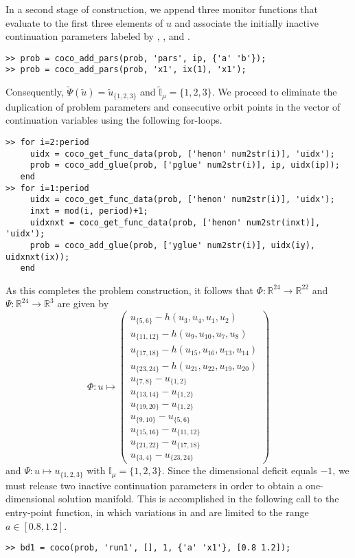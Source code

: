 In a second stage of construction, we append three monitor functions that evaluate to the first three elements of $u$ and associate the initially inactive continuation parameters labeled by , , and .
\begin{lstlisting}[language=coco-highlight]
>> prob = coco_add_pars(prob, 'pars', ip, {'a' 'b'});
>> prob = coco_add_pars(prob, 'x1', ix(1), 'x1');
\end{lstlisting}
Consequently, $\tilde{\Psi}(\tilde{u})=\tilde{u}_{\{1,2,3\}}$ and $\tilde{\mathbb{I}}_\mu=\{1,2,3\}$. We proceed to eliminate the duplication of problem parameters and consecutive orbit points in the vector of continuation variables using the following for-loops.
\begin{lstlisting}[language=coco-highlight]
>> for i=2:period
     uidx = coco_get_func_data(prob, ['henon' num2str(i)], 'uidx');
     prob = coco_add_glue(prob, ['pglue' num2str(i)], ip, uidx(ip));
   end
>> for i=1:period
     uidx = coco_get_func_data(prob, ['henon' num2str(i)], 'uidx');
     inxt = mod(i, period)+1;
     uidxnxt = coco_get_func_data(prob, ['henon' num2str(inxt)], 'uidx');
     prob = coco_add_glue(prob, ['yglue' num2str(i)], uidx(iy), uidxnxt(ix));
   end
\end{lstlisting}
As this completes the problem construction, it follows that $\Phi:\mathbb{R}^{24}\rightarrow\mathbb{R}^{22}$ and $\Psi:\mathbb{R}^{24}\rightarrow\mathbb{R}^3$ are given by
\begin{equation}
\Phi:u\mapsto\left(\begin{array}{c}u_{\{5,6\}}-h(u_3,u_4,u_1,u_2)\\u_{\{11,12\}}-h(u_9,u_{10},u_7,u_8)\\u_{\{17,18\}}-h(u_{15},u_{16},u_{13},u_{14})\\u_{\{23,24\}}-h(u_{21},u_{22},u_{19},u_{20})\\u_{\{7,8\}}-u_{\{1,2\}}\\u_{\{13,14\}}-u_{\{1,2\}}\\u_{\{19,20\}}-u_{\{1,2\}}\\u_{\{9,10\}}-u_{\{5,6\}}\\u_{\{15,16\}}-u_{\{11,12\}}\\u_{\{21,22\}}-u_{\{17,18\}}\\u_{\{3,4\}}-u_{\{23,24\}}\end{array}\right)
\end{equation}
and $\Psi:u\mapsto u_{\{1,2,3\}}$ with $\mathbb{I}_\mu=\{1,2,3\}$. Since the dimensional deficit equals $-1$, we must release two inactive continuation parameters in order to obtain a one-dimensional solution manifold. This is accomplished in the following call to the  entry-point function, in which variations in  and  are limited to the range $a\in[0.8,1.2]$.
\begin{lstlisting}[language=coco-highlight]
>> bd1 = coco(prob, 'run1', [], 1, {'a' 'x1'}, [0.8 1.2]);
\end{lstlisting}

